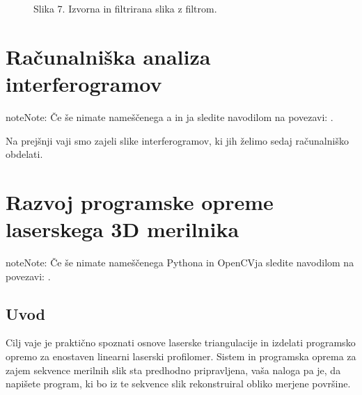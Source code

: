 \documentclass[letterpaper,10pt,english]{sphinxmanual}
\begin{document}
\begin{figure}[htbp]
\centering
\capstart

\noindent{}
\caption{Slika 7. Izvorna in filtrirana slika z  filtrom.}\label{\detokenize{uvod_py_opencv:id8}}\end{figure}


\chapter{Računalniška analiza interferogramov}
\label{\detokenize{obdelava_interferogramov:racunalniska-analiza-interferogramov}}\label{\detokenize{obdelava_interferogramov:obdelava-interferogramov}}\label{\detokenize{obdelava_interferogramov::doc}}
\begin{sphinxadmonition}{note}{Note:}
\sphinxAtStartPar
Če še nimate nameščenega \sphinxhyphen{}a in \sphinxhyphen{}ja sledite navodilom na povezavi: .
\end{sphinxadmonition}

\sphinxAtStartPar
Na prejšnji vaji smo zajeli slike interferogramov, ki jih želimo sedaj računalniško obdelati.


\chapter{Razvoj programske opreme laserskega 3D merilnika}
\label{\detokenize{laserskiprofilomer:razvoj-programske-opreme-laserskega-3d-merilnika}}\label{\detokenize{laserskiprofilomer:laserskiprofilomer}}\label{\detokenize{laserskiprofilomer::doc}}
\begin{sphinxadmonition}{note}{Note:}
\sphinxAtStartPar
Če še nimate nameščenega Pythona in OpenCVja sledite navodilom na povezavi: .
\end{sphinxadmonition}


\section{Uvod}
\label{\detokenize{laserskiprofilomer:uvod}}
\sphinxAtStartPar
Cilj vaje je praktično spoznati osnove laserske triangulacije in izdelati programsko opremo za enostaven linearni laserski profilomer. Sistem in programska oprema za zajem sekvence merilnih slik sta predhodno pripravljena, vaša naloga pa je, da napišete program, ki bo iz te sekvence slik rekonstruiral obliko merjene površine.
\end{document}

